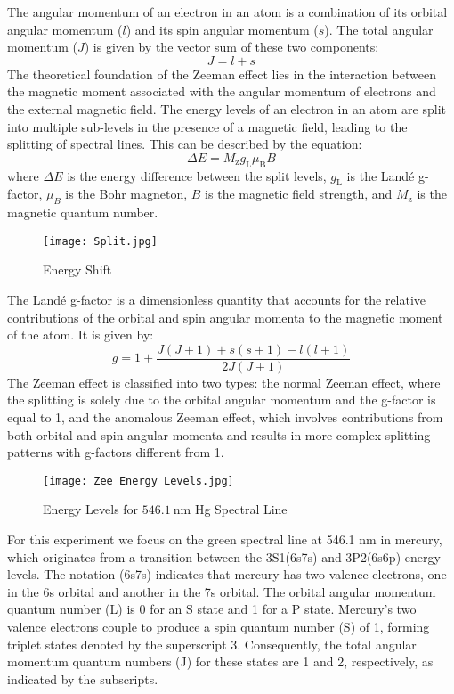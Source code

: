 \documentclass[11pt]{article}
\begin{document}
	The angular momentum of an electron in an atom is a combination of its orbital angular momentum (\(l\)) and its spin angular momentum (\(s\)). The total angular momentum (\(J\)) is given by the vector sum of these two components:
	\begin{equation}
		J = l + s \label{eq:1}
	\end{equation}
	The theoretical foundation of the Zeeman effect lies in the interaction between the magnetic moment associated with the angular momentum of electrons and the external magnetic field. The energy levels of an electron in an atom are split into multiple sub-levels in the presence of a magnetic field, leading to the splitting of spectral lines. This can be described by the equation:
	\begin{equation}
		\Delta E = M_\mathrm{z} g_\mathrm{L} \mu_\mathrm{B} B \label{eq:2}
	\end{equation}
	where \(\Delta E\) is the energy difference between the split levels, \(g_\mathrm{L}\) is the Landé g-factor, \(\mu_B\) is the Bohr magneton, \(B\) is the magnetic field strength, and \(M_\mathrm{z}\) is the magnetic quantum number.
	
	\begin{figure}[htbp]
		\centering
		\caption{Energy Shift}
		\texttt{[image: Split.jpg]}
	\end{figure}
	
	The Landé g-factor is a dimensionless quantity that accounts for the relative contributions of the orbital and spin angular momenta to the magnetic moment of the atom. It is given by:
	\begin{equation}
		g = 1 + \frac{J(J + 1) + s(s + 1) - l(l + 1)}{2J(J + 1)} \label{eq:3}
	\end{equation}
	The Zeeman effect is classified into two types: the normal Zeeman effect, where the splitting is solely due to the orbital angular momentum and the g-factor is equal to 1, and the anomalous Zeeman effect, which involves contributions from both orbital and spin angular momenta and results in more complex splitting patterns with g-factors different from 1.
	
	\begin{figure}[htbp]
		\centering
		\caption{Energy Levels for $\qty{546.1}{\nano\meter}$ Hg Spectral Line}
		\texttt{[image: Zee Energy Levels.jpg]}
	\end{figure}
	
	For this experiment we focus on the green spectral line at 546.1 nm in mercury, which originates from a transition between the 3S1(6s7s) and 3P2(6s6p) energy levels. The notation (6s7s) indicates that mercury has two valence electrons, one in the 6s orbital and another in the 7s orbital. The orbital angular momentum quantum number (L) is 0 for an S state and 1 for a P state. Mercury's two valence electrons couple to produce a spin quantum number (S) of 1, forming triplet states denoted by the superscript 3. Consequently, the total angular momentum quantum numbers (J) for these states are 1 and 2, respectively, as indicated by the subscripts.
	
\end{document}
